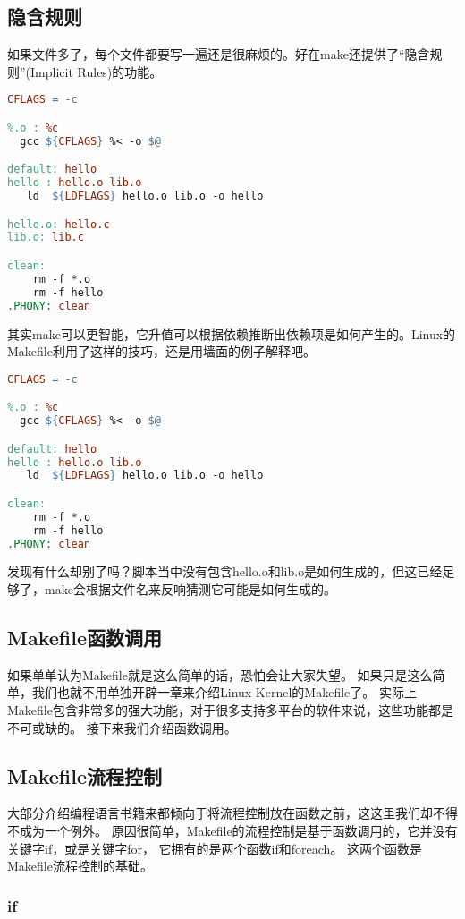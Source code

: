 \subsection{隐含规则}
如果文件多了，每个文件都要写一遍还是很麻烦的。好在make还提供了“隐含规则”(Implicit Rules)的功能。
\begin{lstlisting}[language=make]
CFLAGS = -c

%.o : %c
  gcc ${CFLAGS} %< -o $@

default: hello
hello : hello.o lib.o
   ld  ${LDFLAGS} hello.o lib.o -o hello

hello.o: hello.c
lib.o: lib.c

clean:
    rm -f *.o
    rm -f hello
.PHONY: clean
\end{lstlisting}
其实make可以更智能，它升值可以根据依赖推断出依赖项是如何产生的。Linux的Makefile利用了这样的技巧，还是用墙面的例子解释吧。
\begin{lstlisting}[language=make]
CFLAGS = -c

%.o : %c
  gcc ${CFLAGS} %< -o $@

default: hello
hello : hello.o lib.o
   ld  ${LDFLAGS} hello.o lib.o -o hello

clean:
    rm -f *.o
    rm -f hello
.PHONY: clean
\end{lstlisting}
发现有什么却别了吗？脚本当中没有包含hello.o和lib.o是如何生成的，但这已经足够了，make会根据文件名来反响猜测它可能是如何生成的。

\subsection{Makefile函数调用}
如果单单认为Makefile就是这么简单的话，恐怕会让大家失望。
如果只是这么简单，我们也就不用单独开辟一章来介绍Linux Kernel的Makefile了。
实际上Makefile包含非常多的强大功能，对于很多支持多平台的软件来说，这些功能都是不可或缺的。
接下来我们介绍函数调用。

\subsection{Makefile流程控制}
大部分介绍编程语言书籍来都倾向于将流程控制放在函数之前，这这里我们却不得不成为一个例外。
原因很简单，Makefile的流程控制是基于函数调用的，它并没有关键字if，或是关键字for，
它拥有的是两个函数if和foreach。
这两个函数是Makefile流程控制的基础。
\subsubsection{if}

